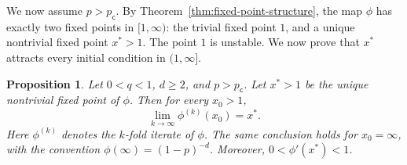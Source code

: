 \documentclass[11pt]{amsart}
\theoremstyle{plain}
\newtheorem{proposition}[theorem]{Proposition}
\theoremstyle{definition}
\theoremstyle{remark}
\newcommand{\pc}{p_{\mathsf{c}}}
\begin{document}
We now assume $p>\pc$. By Theorem~\ref{thm:fixed-point-structure}, the map \(\phi\) has exactly two fixed points in \([1,\infty)\): the trivial fixed point \(1\), and a unique nontrivial fixed point \(x^*>1\). The point \(1\) is unstable. We now prove that $x^*$ attracts every initial condition in $(1,\infty]$.

\begin{proposition}
\label{prop:attractivity}
Let \(0<q<1\), \(d\ge2\), and \(p>\pc\). Let \(x^*>1\) be the unique nontrivial fixed point of \(\phi\). Then for every \(x_0>1\),
\[
    \lim_{k\to\infty}\phi^{(k)}(x_0)=x^*.
\]
Here $\phi^{(k)}$ denotes the $k$-fold iterate of $\phi$.
The same conclusion holds for \(x_0=\infty\), with the convention \(\phi(\infty)=(1-p)^{-d}\). Moreover, $0<\phi'(x^*)<1$.
\end{proposition}
\end{document}
